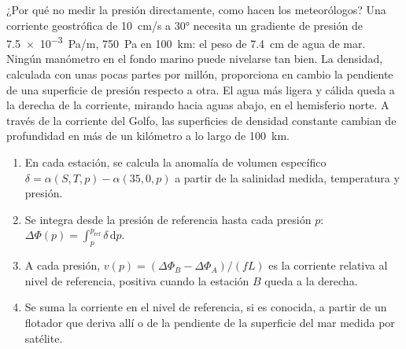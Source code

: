 ¿Por qué no medir la presión directamente, como hacen los meteorólogos? Una corriente geostrófica
de \qty{10}{cm/s} a \ang{30} necesita un gradiente de presión de
\qty{7.5e-3}{Pa/m}, \qty{750}{Pa} en \qty{100}{km}: el peso de
\qty{7.4}{cm} de agua de mar. Ningún manómetro en el fondo marino puede
nivelarse tan bien. La densidad, calculada con unas pocas partes por millón,
proporciona en cambio la pendiente de una superficie de presión respecto a otra. El
agua más ligera y cálida queda a la derecha de la corriente, mirando hacia aguas abajo,
en el hemisferio norte. A través de la corriente del Golfo, las superficies de densidad constante
cambian de profundidad en más de un kilómetro a lo largo de \qty{100}{km}.

\begin{method}\label{met:b3:ocean-dynamics:dynamic}
\begin{enumerate}
\item En cada estación, se calcula la anomalía de volumen específico $\delta =
  \alpha(S, T, p) - \alpha(35, 0, p)$ a partir de la salinidad medida,
  temperatura y presión.
\item Se integra desde la presión de referencia hasta cada presión $p$:
  $\Delta\Phi(p) = \int_p^{p_{\text{ref}}}\delta\,\mathrm dp$.
\item A cada presión, $v(p) = (\Delta\Phi_B - \Delta\Phi_A)/(fL)$ es
  la corriente relativa al nivel de referencia, positiva cuando la estación $B$
  queda a la derecha.
\item Se suma la corriente en el nivel de referencia, si es conocida, a partir de un flotador
  que deriva allí o de la pendiente de la superficie del mar medida por satélite.
\end{enumerate}
\end{method}

